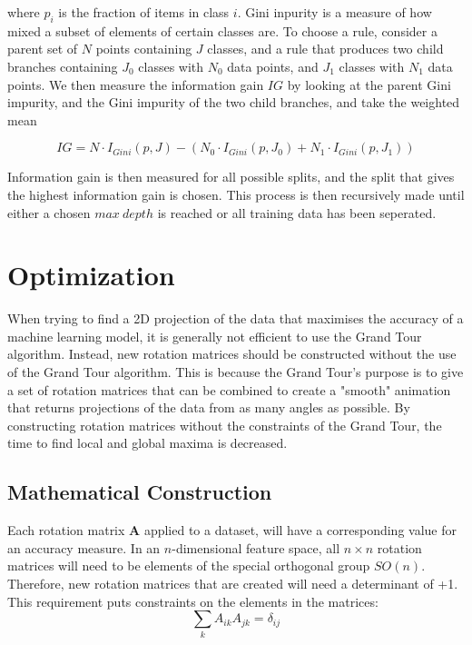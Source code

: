 \documentclass[a4paper,11pt,twoside]{article}
\begin{document}
where $p_i$ is the fraction of items in class $i$. Gini inpurity is a measure of how mixed a subset of elements of certain classes are. To choose a rule, consider a parent set of $N$ points containing $J$ classes, and a rule that produces two child branches containing $J_0$ classes with $N_0$ data points, and $J_1$ classes with $N_1$ data points. We then measure the information gain $IG$ by looking at the parent Gini impurity, and the Gini impurity of the two child branches, and take the weighted mean

\begin{equation}
IG= N\cdot I_{Gini}(p, J) - (N_0\cdot I_{Gini}(p, J_0) + N_1\cdot I_{Gini}(p, J_1))
\end{equation}

Information gain is then measured for all possible splits, and the split that gives the highest information gain is chosen. This process is then recursively made until either a chosen $max\ depth$ is reached or all training data has been seperated.  

\newpage
\section{Optimization}

When trying to find a 2D projection of the data that maximises the accuracy of a machine learning model, it is generally not efficient to use the Grand Tour algorithm. Instead, new rotation matrices should be constructed without the use of the Grand Tour algorithm. This is because the Grand Tour's purpose is to give a set of rotation matrices that can be combined to create a "smooth" animation that returns projections of the data from as many angles as possible. By constructing rotation matrices without the constraints of the Grand Tour, the time to find local and global maxima is decreased.

\subsection{Mathematical Construction}

Each rotation matrix $\bm{A}$ applied to a dataset, will have a corresponding value for an accuracy measure. In an $n$-dimensional feature space, all $n\times n$ rotation matrices will need to be elements of the special orthogonal group $SO(n)$. Therefore, new rotation matrices that are created will need a determinant of +1. This requirement puts constraints on the elements in the matrices:
\begin{equation}
\sum_{k}A_{ik}A_{jk} = \delta_{ij}
\end{equation}
\end{document}
